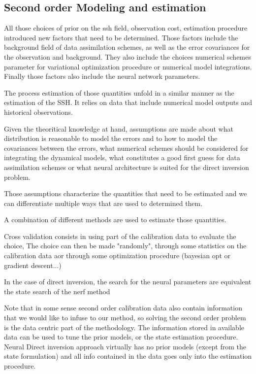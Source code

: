 \begin{bibunit}
\section{Second order Modeling and estimation}
All those choices of prior on the ssh field, observation cost, estimation procedure introduced new factors that need to be determined.
Those factors include the background field of data assimilation schemes, as well as the error covariances for the observation and background. They also include the choices numerical schemes parameter for variational optimization procedure or numerical model integrations. Finally those factors also include the neural network parameters.

The process estimation of those quantities unfold in a similar manner as the estimation of the SSH.
It relies on data that include numerical model outputs and historical observations.

Given the theoritical knowledge at hand, assumptions are made about what distribution is reasonable to model the errors and to how to model the covariances between the errors, what numerical schemes should be considered for integrating the dynamical models, what constitutes a good first guess for data assimilation schemes or what neural architecture is suited for the direct inversion problem.

Those assumptions characterize the quantities that need to be estimated and we can differentiate multiple ways that are used to determined them.

A combination of different methods are used to estimate those quantities.

Cross validation consists in using part of the calibration data to evaluate the choice, 
The choice can then be made "randomly", through some statistics on the calibration data aor through some optimization procedure (bayesian opt or gradient descent...)

In the case of direct inversion, the search for the neural parameters are equivalent the state search of the nerf method

Note that in some sense second order calibration data also contain information that we would like to infuse to our method, so solving the second order problem is the data centric part of the methodology. 
The information stored in available data can be used to tune the prior models, or the state estimation procedure.
Neural Direct inversion approach virtually has no prior models (except from the state formulation) and all info contained in the data goes only into the estimation procedure.


\end{bibunit}
